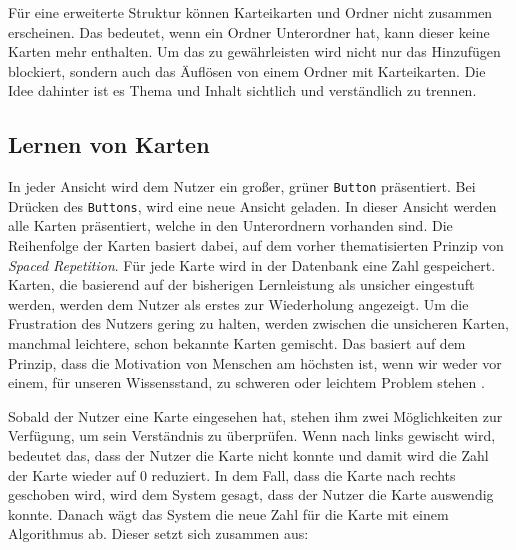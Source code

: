 Für eine erweiterte Struktur können Karteikarten und Ordner nicht zusammen erscheinen. Das bedeutet, wenn ein Ordner Unterordner hat, kann dieser keine Karten mehr enthalten. Um das zu gewährleisten wird nicht nur das Hinzufügen blockiert, sondern auch das Äuflösen von einem Ordner mit Karteikarten. Die Idee dahinter ist es Thema und Inhalt sichtlich und verständlich zu trennen.

\subsection{Lernen von Karten}
In jeder Ansicht wird dem Nutzer ein großer, grüner \texttt{Button} präsentiert. Bei Drücken des \texttt{Buttons}, wird eine neue Ansicht geladen. In dieser Ansicht werden alle Karten präsentiert, welche in den Unterordnern vorhanden sind. Die Reihenfolge der Karten basiert dabei, auf dem vorher thematisierten Prinzip von \textit{Spaced Repetition}. Für jede Karte wird in der Datenbank eine Zahl gespeichert. Karten, die basierend auf der bisherigen Lernleistung als unsicher eingestuft werden, werden dem Nutzer als erstes zur Wiederholung angezeigt. Um die Frustration des Nutzers gering zu halten, werden zwischen die unsicheren Karten, manchmal leichtere, schon bekannte Karten gemischt. Das basiert auf dem Prinzip, dass die Motivation von Menschen am höchsten ist, wenn wir weder vor einem, für unseren Wissensstand, zu schweren oder leichtem Problem stehen \cite{AtomicHabits}.

Sobald der Nutzer eine Karte eingesehen hat, stehen ihm zwei Möglichkeiten zur Verfügung, um sein Verständnis zu überprüfen. Wenn nach links gewischt wird, bedeutet das, dass der Nutzer die Karte nicht konnte und damit wird die Zahl der Karte wieder auf 0 reduziert. In dem Fall, dass die Karte nach rechts geschoben wird, wird dem System gesagt, dass der Nutzer die Karte auswendig konnte. Danach wägt das System die neue Zahl für die Karte mit einem Algorithmus ab. Dieser setzt sich zusammen aus:

